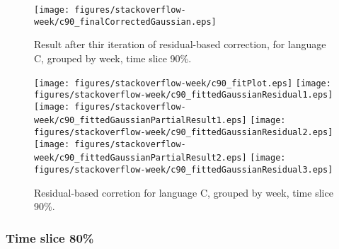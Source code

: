 \begin{figure}[]
\centering
{\texttt{[image: figures/stackoverflow-week/c90\_finalCorrectedGaussian.eps]}}
\caption{Result after thir iteration of residual-based correction, for language C, grouped by week, time slice 90\%.}
\end{figure}


\begin{figure}[hb]
\centering
{}
{\texttt{[image: figures/stackoverflow-week/c90\_fitPlot.eps]}}
{\texttt{[image: figures/stackoverflow-week/c90\_fittedGaussianResidual1.eps]}}
{\texttt{[image: figures/stackoverflow-week/c90\_fittedGaussianPartialResult1.eps]}}
{\texttt{[image: figures/stackoverflow-week/c90\_fittedGaussianResidual2.eps]}}
{\texttt{[image: figures/stackoverflow-week/c90\_fittedGaussianPartialResult2.eps]}}
{\texttt{[image: figures/stackoverflow-week/c90\_fittedGaussianResidual3.eps]}}
\caption{Residual-based corretion for language C, grouped by week, time slice 90\%.}
\end{figure}


\clearpage 
\newpage 


\FloatBarrier

\subsubsection{Time slice 80\%}

